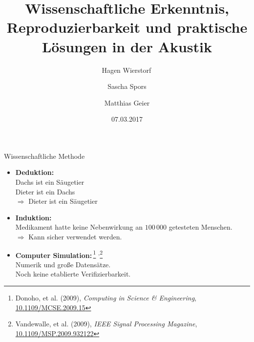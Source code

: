 \documentclass{beamer}
\begin{document}
\title{Wissenschaftliche Erkenntnis, Reproduzierbarkeit und praktische Lösungen
in der Akustik}
\author{Hagen Wierstorf$\,$ \and
        Sascha Spors \and
        Matthias Geier}
\date{07.03.2017}
\maketitle

\begin{frame}{Wissenschaftliche Methode}

    \begin{itemize}
        \item \textbf{Deduktion:} \\
            \small{Dachs ist ein Säugetier\\%
                   Dieter ist ein Dachs\\%
                   $\Rightarrow$ Dieter ist ein Säugetier}
    \end{itemize}
    \begin{itemize}
        \item \textbf{Induktion:} \\
            \small{Medikament hatte keine Nebenwirkung an $100\,000$ getesteten
                   Menschen.\\%
                   $\Rightarrow$ Kann sicher verwendet werden.}
    \end{itemize}
    \begin{itemize}
        \item \textbf{Computer Simulation:}\,\footnote{%
            Donoho, et al. (2009), \emph{Computing in Science \& Engineering},
            \href{https://doi.org/10.1109/MCSE.2009.15}{10.1109/MCSE.2009.15}}%
            \textsuperscript{,}\footnote{%
            Vandewalle, et al. (2009), \emph{IEEE Signal Processing Magazine},
            \href{https://doi.org/10.1109/MSP.2009.932122}{10.1109/MSP.2009.932122}}
            \\
            \small{Numerik und große Datensätze.\\
            Noch keine etablierte Verifizierbarkeit.}
    \end{itemize}

\end{frame}
\end{document}
